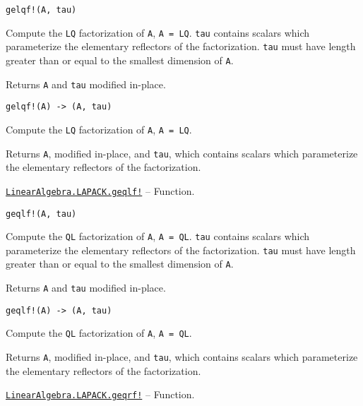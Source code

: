 \begin{adjustwidth}{2em}{0pt}


\begin{verbatim}
gelqf!(A, tau)
\end{verbatim}

Compute the \texttt{LQ} factorization of \texttt{A}, \texttt{A = LQ}. \texttt{tau} contains scalars which parameterize the elementary reflectors of the factorization. \texttt{tau} must have length greater than or equal to the smallest dimension of \texttt{A}.

Returns \texttt{A} and \texttt{tau} modified in-place.




\begin{lstlisting}
gelqf!(A) -> (A, tau)
\end{lstlisting}

Compute the \texttt{LQ} factorization of \texttt{A}, \texttt{A = LQ}.

Returns \texttt{A}, modified in-place, and \texttt{tau}, which contains scalars which parameterize the elementary reflectors of the factorization.



\end{adjustwidth}
\hypertarget{870700918778332837}{} 
\hyperlink{870700918778332837}{\texttt{LinearAlgebra.LAPACK.geqlf!}}  -- {Function.}

\begin{adjustwidth}{2em}{0pt}


\begin{verbatim}
geqlf!(A, tau)
\end{verbatim}

Compute the \texttt{QL} factorization of \texttt{A}, \texttt{A = QL}. \texttt{tau} contains scalars which parameterize the elementary reflectors of the factorization. \texttt{tau} must have length greater than or equal to the smallest dimension of \texttt{A}.

Returns \texttt{A} and \texttt{tau} modified in-place.




\begin{lstlisting}
geqlf!(A) -> (A, tau)
\end{lstlisting}

Compute the \texttt{QL} factorization of \texttt{A}, \texttt{A = QL}.

Returns \texttt{A}, modified in-place, and \texttt{tau}, which contains scalars which parameterize the elementary reflectors of the factorization.



\end{adjustwidth}
\hypertarget{1667844416130160920}{} 
\hyperlink{1667844416130160920}{\texttt{LinearAlgebra.LAPACK.geqrf!}}  -- {Function.}


